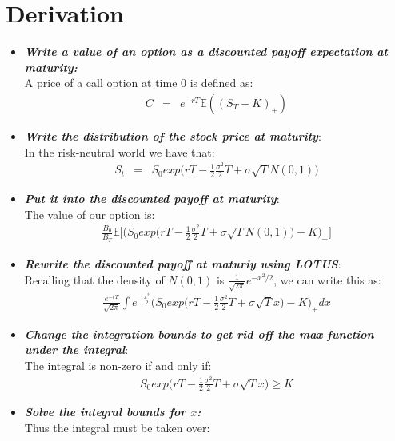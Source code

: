 \section{Derivation}
\begin{itemize}
	\item \textbf{\textit{Write a value of an option as a discounted payoff expectation at maturity:}}\\
A price of a call option at time $0$ is defined as:
\begin{eqnarray}
C &=& e^{-rT}\mathbb{E}((S_{T} - K)_{+})
\end{eqnarray}
	\item \textbf{\textit{Write the distribution of the stock price at maturity}}:\\
In the risk-neutral world we have that:
\begin{eqnarray}
S_{t} &=& S_{0}exp\bigg(rT - \frac{1}{2}\frac{\sigma ^{2}}{2}T + \sigma\sqrt{T}N(0, 1)\bigg)
\end{eqnarray}
	\item \textbf{\textit{Put it into the discounted payoff at maturity}}:\\
	The value of our option is:
	\begin{eqnarray}
	\frac{B_{0}}{B_{T}}\mathbb{E}\bigg[\bigg(S_{0}exp\bigg(rT - \frac{1}{2}\frac{\sigma ^{2}}{2}T + \sigma\sqrt{T}N(0, 1)\bigg) - K\bigg)_{+}\bigg]
	\end{eqnarray}
	\item \textbf{\textit{Rewrite the discounted payoff at maturiy using LOTUS}}:\\
	Recalling that the density of $N(0, 1)$ is $\frac{1}{\sqrt{2\pi}}e^{-x^{2}/2}$, we can write this as:
	\begin{eqnarray}
		\frac{e^{-rT}}{\sqrt{2\pi}}\int{e^{-\frac{x^{2}}{2}}\bigg(S_{0}exp\bigg(rT - \frac{1}{2}\frac{\sigma ^{2}}{2}T + \sigma\sqrt{T}x\bigg) - K\bigg)_{+}}dx
	\end{eqnarray}
	\item \textbf{\textit{Change the integration bounds to get rid off the max function under the integral}}:\\
	The integral is non-zero if and only if:
	\begin{eqnarray}
		S_{0}exp\bigg(rT - \frac{1}{2}\frac{\sigma ^{2}}{2}T + \sigma\sqrt{T}x\bigg) \geq K
	\end{eqnarray}
	\item \textbf{\textit{Solve the integral bounds for $x$:}}\\
	Thus the integral must be taken over:

\end{itemize}
